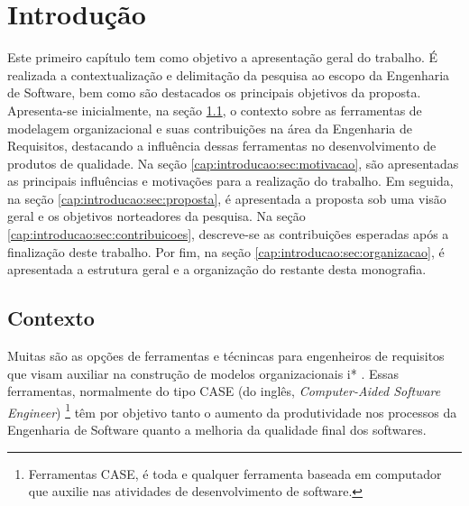 \chapter{Introdução}
    \label{cap:introducao}
            Este primeiro capítulo tem como objetivo a apresentação geral do trabalho.
            É realizada a contextualização e delimitação da pesquisa ao escopo da Engenharia de Software,
            bem como
            são destacados os principais objetivos da proposta.
                Apresenta-se inicialmente,
                na seção \ref{cap:introducao:sec:contexto},
                o contexto sobre as ferramentas de modelagem organizacional e suas contribuições na área da Engenharia de Requisitos, destacando a influência dessas ferramentas no desenvolvimento de produtos de qualidade.
                Na seção \ref{cap:introducao:sec:motivacao}, são apresentadas as principais influências e motivações para a realização do trabalho.
                Em seguida,
                na seção \ref{cap:introducao:sec:proposta},
                é apresentada a proposta sob uma visão geral e os objetivos norteadores da pesquisa.
                Na seção \ref{cap:introducao:sec:contribuicoes},
                 descreve-se as contribuições esperadas após a finalização deste trabalho.
                Por fim,
                 na seção \ref{cap:introducao:sec:organizacao},
                é apresentada a estrutura geral e a organização do restante desta monografia.
    \section{Contexto}
        \label{cap:introducao:sec:contexto}
            Muitas são as opções de ferramentas e técnincas para engenheiros de requisitos
            que visam auxiliar na construção de modelos organizacionais i*
                \cite{site2013iwiki}
                \cite{grau2006comparative}.
            Essas ferramentas, normalmente do tipo CASE (do inglês, \emph{Computer-Aided Software Engineer})
                \footnote{Ferramentas CASE, é toda e qualquer ferramenta baseada em computador que auxilie nas atividades de desenvolvimento de software.}
                 \cite{case1985computer}
            têm por objetivo tanto o aumento da produtividade nos processos da Engenharia de Software quanto a melhoria da qualidade final dos softwares.

